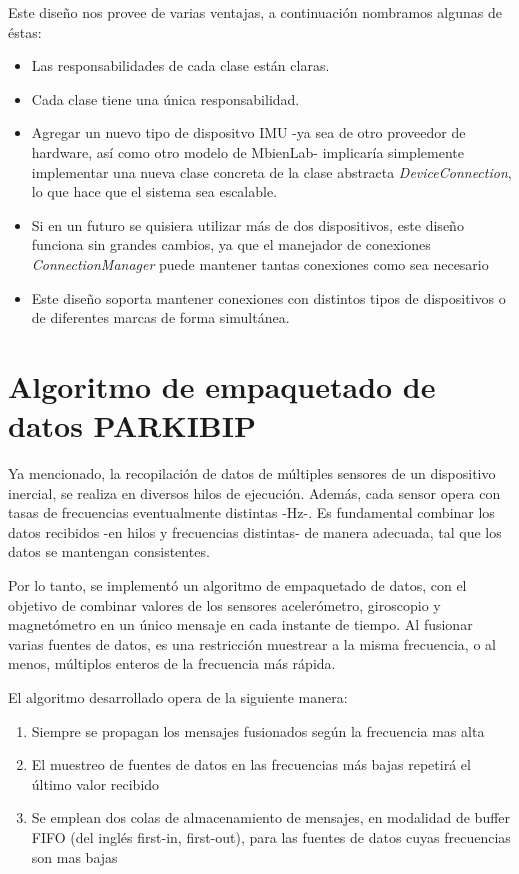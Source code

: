 Este diseño nos provee de varias ventajas, a continuación nombramos algunas de éstas:

\begin{itemize}
    \item Las responsabilidades de cada clase están claras.
    \item Cada clase tiene una única responsabilidad.
    \item Agregar un nuevo tipo de dispositvo IMU -ya sea de otro proveedor de hardware, así como otro modelo de MbienLab- implicaría simplemente implementar una nueva clase concreta de la clase abstracta \textit{DeviceConnection}, lo que hace que el sistema sea escalable.
    \item Si en un futuro se quisiera utilizar más de dos dispositivos, este diseño funciona sin grandes cambios, ya que el manejador de conexiones \textit{ConnectionManager} puede mantener tantas conexiones como sea necesario 
    \item Este diseño soporta mantener conexiones con distintos tipos de dispositivos o de diferentes marcas de forma simultánea.
\end{itemize}
\newpage

\section{Algoritmo de empaquetado de datos PARKIBIP}

Ya mencionado, la recopilación de datos de múltiples sensores de un dispositivo inercial, se realiza en diversos hilos de ejecución. Además, cada sensor opera con tasas de frecuencias eventualmente distintas -Hz-. Es fundamental combinar los datos recibidos -en hilos y frecuencias distintas- de manera adecuada, tal que los datos se mantengan consistentes.

Por lo tanto, se implementó un algoritmo de empaquetado de datos, con el objetivo de combinar valores de los sensores acelerómetro, giroscopio y magnetómetro en un único mensaje en cada instante de tiempo. Al fusionar varias fuentes de datos, es una restricción muestrear a la misma frecuencia, o al menos, múltiplos enteros de la frecuencia más rápida. 

El algoritmo desarrollado opera de la siguiente manera:
\begin{enumerate}
    \item Siempre se propagan los mensajes fusionados según la frecuencia mas alta
    \item El muestreo de fuentes de datos en las frecuencias más bajas repetirá el último valor recibido
    \item Se emplean dos colas de almacenamiento de mensajes, en modalidad de buffer FIFO (del inglés first-in, first-out), para las fuentes de datos cuyas frecuencias son mas bajas
\end{enumerate}


